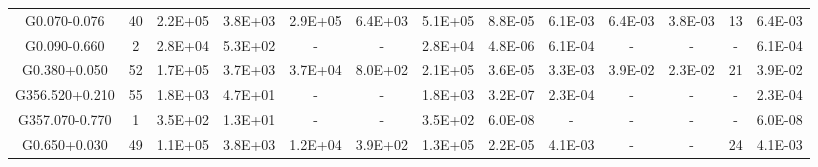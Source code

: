 \begin{table*}
\begin{tabular}{ccccccccccccc}
G0.070-0.076 & 40 & 2.2E+05 & 3.8E+03 & 2.9E+05 & 6.4E+03 & 5.1E+05 & 8.8E-05 & 6.1E-03 & 6.4E-03 & 3.8E-03 & 13 & 6.4E-03 \\
G0.090-0.660 & 2 & 2.8E+04 & 5.3E+02 & - & - & 2.8E+04 & 4.8E-06 & 6.1E-04 & - & - & - & 6.1E-04 \\
G0.380+0.050 & 52 & 1.7E+05 & 3.7E+03 & 3.7E+04 & 8.0E+02 & 2.1E+05 & 3.6E-05 & 3.3E-03 & 3.9E-02 & 2.3E-02 & 21 & 3.9E-02 \\
G356.520+0.210 & 55 & 1.8E+03 & 4.7E+01 & - & - & 1.8E+03 & 3.2E-07 & 2.3E-04 & - & - & - & 2.3E-04 \\
G357.070-0.770 & 1 & 3.5E+02 & 1.3E+01 & - & - & 3.5E+02 & 6.0E-08 & - & - & - & - & 6.0E-08 \\
G0.650+0.030 & 49 & 1.1E+05 & 3.8E+03 & 1.2E+04 & 3.9E+02 & 1.3E+05 & 2.2E-05 & 4.1E-03 & - & - & 24 & 4.1E-03 \\  
\end{tabular}
\end{table*}